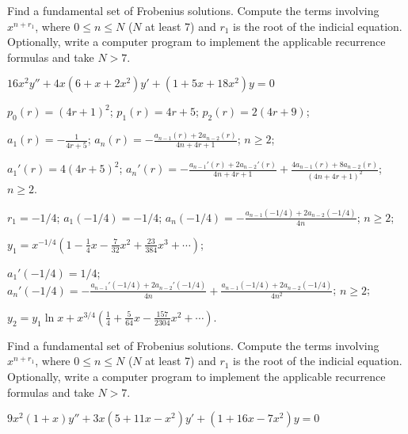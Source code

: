 \documentclass{ximera}
\begin{document}
\begin{problem}\label{exer:7.6.10}
Find a fundamental set of Frobenius solutions. Compute the terms involving $x^{n+r_1}$, where $0\leq n \leq N$ ($N$ at least 7) and $r_1$ is the root of the indicial equation. Optionally, write a computer
program to implement the applicable recurrence formulas and take $N > 7$.

$16x^2y''+4x(6+x+2x^2)y'+(1+5x+18x^2)y=0$

\begin{solution}
    $p_0(r)=(4r+1)^2$;
$p_1(r)=4r+5$;
$p_2(r)=2(4r+9)$;

$a_1(r)=-\frac{1}{4r+5}$;
$a_n(r)=
-\frac{a_{n-1}(r)+2a_{n-2}(r)}{4n+4r+1}$;
$n\geq 2$;


$a_1'(r)={4}{(4r+5)^2}$;
$a_n'(r)=
-\frac{a_{n-1}'(r)+2a_{n-2}'(r)}{4n+4r+1}
+\frac{4a_{n-1}(r)+8a_{n-2}(r)}{(4n+4r+1)^2}$;
$n\geq 2$.


$r_1=-1/4$;
$a_1(-1/4)=-1/4$;
$a_n(-1/4)=
-\frac{a_{n-1}(-1/4)+2a_{n-2}(-1/4)}{4n}$;
$n\geq 2$;

$y_1=x^{-1/4}\left(1-\frac{1}{4}x-\frac{7}{32}x^2+\frac{23}{384}x^3
+\cdots\right)$;

$a_1'(-1/4)=1/4$;
$a_n'(-1/4)=
-\frac{a_{n-1}'(-1/4)+2a_{n-2}'(-1/4)}{4n}
+\frac{a_{n-1}(-1/4)+2a_{n-2}(-1/4)}{4n^2}$;
$n\geq 2$;

$y_2=
y_1\ln x+x^{3/4}\left(\frac{1}{4}+\frac{5}{64}x-\frac{157}{2304}x^2
+\cdots\right)$.

\end{solution}
\end{problem}

\begin{problem}\label{exer:7.6.11}
Find a fundamental set of Frobenius solutions. Compute the terms involving $x^{n+r_1}$, where $0\leq n \leq N$ ($N$ at least 7) and $r_1$ is the root of the indicial equation. Optionally, write a computer
program to implement the applicable recurrence formulas and take $N > 7$.

$9x^2(1+x)y''+3x(5+11x-x^2)y'+(1+16x-7x^2)y=0$
\end{problem}
\end{document}
